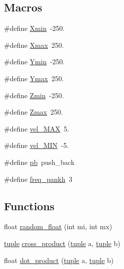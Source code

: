 \subsection*{Macros}
\begin{DoxyCompactItemize}
\item 
\#define \hyperlink{_parametric_2_starling-_simulation_2include_2boid_8h_a87b12152029095a33dd01868f0417236}{Xmin}~-\/250.
\item 
\#define \hyperlink{_parametric_2_starling-_simulation_2include_2boid_8h_a8fd091040600c54e1b52be58d011ec30}{Xmax}~250.
\item 
\#define \hyperlink{_parametric_2_starling-_simulation_2include_2boid_8h_a1653af7892c7f1b3364e1ba87fc75cc1}{Ymin}~-\/250.
\item 
\#define \hyperlink{_parametric_2_starling-_simulation_2include_2boid_8h_aaf9edb39f963596bfe86fc184965dcb4}{Ymax}~250.
\item 
\#define \hyperlink{_parametric_2_starling-_simulation_2include_2boid_8h_a7ce6b331ba14d64b6306e6975448d23a}{Zmin}~-\/250.
\item 
\#define \hyperlink{_parametric_2_starling-_simulation_2include_2boid_8h_a5fe1f9b33875209624ea9b93a0871bd6}{Zmax}~250.
\item 
\#define \hyperlink{_parametric_2_starling-_simulation_2include_2boid_8h_ac336537d7a77109375fb312b6c290fcd}{vel\+\_\+\+M\+AX}~5.
\item 
\#define \hyperlink{_parametric_2_starling-_simulation_2include_2boid_8h_a882c6328f75739355a7f260afb1c9c1f}{vel\+\_\+\+M\+IN}~-\/5.
\item 
\#define \hyperlink{_parametric_2_starling-_simulation_2include_2boid_8h_a276c5a0e984cf60015b27252fe04fe6b}{pb}~push\+\_\+back
\item 
\#define \hyperlink{_parametric_2_starling-_simulation_2include_2boid_8h_a3b16749d7ca6b3661d5f3ec81f342650}{freq\+\_\+pankh}~3
\end{DoxyCompactItemize}
\subsection*{Functions}
\begin{DoxyCompactItemize}
\item 
float \hyperlink{_parametric_2_starling-_simulation_2include_2boid_8h_a9594488b515ced509126c685b05f880f}{random\+\_\+float} (int mi, int mx)
\item 
\hyperlink{classtuple}{tuple} \hyperlink{_parametric_2_starling-_simulation_2include_2boid_8h_a314e8396c9d1befd9b196d3a5adc914f}{cross\+\_\+product} (\hyperlink{classtuple}{tuple} a, \hyperlink{classtuple}{tuple} b)
\item 
float \hyperlink{_parametric_2_starling-_simulation_2include_2boid_8h_a5d5b43174fcddb9d32055de5fffd3274}{dot\+\_\+product} (\hyperlink{classtuple}{tuple} a, \hyperlink{classtuple}{tuple} b)
\end{DoxyCompactItemize}


